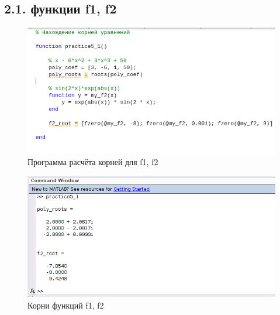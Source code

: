 \documentclass[12pt]{article}
\begin{document}
 \subsection*{2.1. функции f1, f2}
\begin{figure}[!h]
	\centering
	\includegraphics[width=\linewidth]{func_zeros.png}
	\caption{Программа расчёта корней для f1, f2}
\end{figure}

\begin{figure}[!h]
	\centering
	\includegraphics[width=\linewidth]{func_zeros_output.png}
	\caption{Корни функций f1, f2}
\end{figure}
\end{document}
